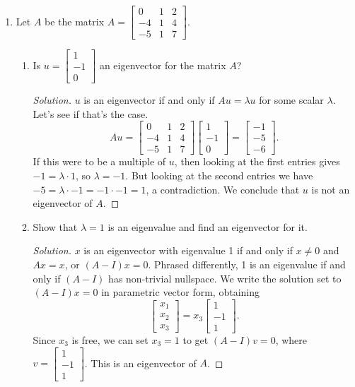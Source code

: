 \documentclass[11pt,letterpaper]{report}
\newenvironment{solution}
{\begin{proof}[Solution]}
{\end{proof}}
\begin{document}
\begin{enumerate}
	\item Let $A$ be the matrix $A = \begin{bmatrix}
		0 & 1 & 2\\
		-4 & 1 & 4\\
		-5 & 1 & 7
	\end{bmatrix}$.
	\begin{enumerate}
		\item Is $u = \begin{bmatrix}
			1\\-1\\0
		\end{bmatrix}$ an eigenvector for the matrix $A$?
		\begin{solution}
			$u$ is an eigenvector if and only if $Au = \lambda u$ for some scalar $\lambda$. Let's see if that's the case.
			\[
			Au = \begin{bmatrix}
			0 & 1 & 2\\
			-4 & 1 & 4\\
			-5 & 1 & 7
			\end{bmatrix}\begin{bmatrix}
			1\\-1\\0
			\end{bmatrix} = \begin{bmatrix}
				-1\\-5\\-6
			\end{bmatrix}.
			\]
			If this were to be a multiple of $u$, then looking at the first entries gives $-1 = \lambda\cdot 1$, so $\lambda = -1$. But looking at the second entries we have $-5 = \lambda \cdot -1 = -1\cdot -1 = 1$, a contradiction. We conclude that $u$ is not an eigenvector of $A$.
		\end{solution}

		\item Show that $\lambda = 1$ is an eigenvalue and find an eigenvector for it.
		\begin{solution}
			$x$ is an eigenvector with eigenvalue 1 if and only if $x\neq 0$ and $Ax = x$, or $(A-I)x = 0$. Phrased differently, 1 is an eigenvalue if and only if $(A-I)$ has non-trivial nullspace. We write the solution set to $(A-I)x = 0$ in parametric vector form, obtaining
			\[
			\begin{bmatrix}
				x_1\\x_2\\x_3
			\end{bmatrix} = x_3 \begin{bmatrix}
				1\\-1\\1
			\end{bmatrix}.
			\]
			Since $x_3$ is free, we can set $x_3 =1$ to get $(A-I)v = 0$, where $v = \begin{bmatrix}
				1\\-1\\1
			\end{bmatrix}$. This is an eigenvector of $A$.
		\end{solution}


\end{enumerate}
\end{enumerate}
\end{document}
